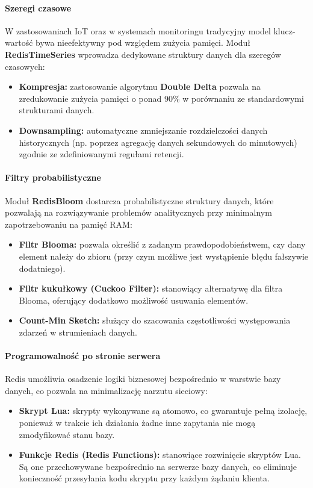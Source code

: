\paragraph{Szeregi czasowe}
W zastosowaniach IoT oraz w systemach monitoringu tradycyjny model klucz-wartość bywa nieefektywny pod względem zużycia pamięci. Moduł \textbf{RedisTimeSeries} wprowadza dedykowane struktury danych dla szeregów czasowych:
\begin{itemize}
    \item \textbf{Kompresja:} zastosowanie algorytmu \textbf{Double Delta} pozwala na zredukowanie zużycia pamięci o ponad 90\% w porównaniu ze standardowymi strukturami danych.
    \item \textbf{Downsampling:} automatyczne zmniejszanie rozdzielczości danych historycznych (np. poprzez agregację danych sekundowych do minutowych) zgodnie ze zdefiniowanymi regułami retencji.
\end{itemize}
\paragraph{Filtry probabilistyczne}
Moduł \textbf{RedisBloom} dostarcza probabilistyczne struktury danych, które pozwalają na rozwiązywanie problemów analitycznych przy minimalnym zapotrzebowaniu na pamięć RAM:
\begin{itemize}
    \item \textbf{Filtr Blooma:} pozwala określić z zadanym prawdopodobieństwem, czy dany element należy do zbioru (przy czym możliwe jest wystąpienie błędu fałszywie dodatniego).
    \item \textbf{Filtr kukułkowy (Cuckoo Filter):} stanowiący alternatywę dla filtra Blooma, oferujący dodatkowo możliwość usuwania elementów.
    \item \textbf{Count-Min Sketch:} służący do szacowania częstotliwości występowania zdarzeń w strumieniach danych.
\end{itemize}

\paragraph{Programowalność po stronie serwera}
Redis umożliwia osadzenie logiki biznesowej bezpośrednio w warstwie bazy danych, co pozwala na minimalizację narzutu sieciowy:
\begin{itemize}
    \item \textbf{Skrypt Lua:} skrypty wykonywane są atomowo, co gwarantuje pełną izolację, ponieważ w trakcie ich działania żadne inne zapytania nie mogą zmodyfikować stanu bazy.
    \item \textbf{Funkcje Redis (Redis Functions):} stanowiące rozwinięcie skryptów Lua. Są one przechowywane bezpośrednio na serwerze bazy danych, co eliminuje konieczność przesyłania kodu skryptu przy każdym żądaniu klienta.
\end{itemize}

